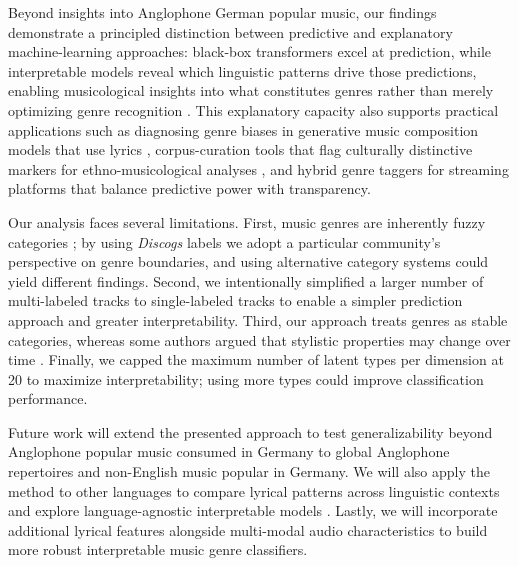 \documentclass{article}
\begin{document}
Beyond insights into Anglophone German popular music, our findings demonstrate a principled distinction between predictive and explanatory machine-learning approaches: black-box transformers excel at prediction, while interpretable models reveal which linguistic patterns drive those predictions, enabling musicological insights into what constitutes genres rather than merely optimizing genre recognition \cite{gardaziBERTApplicationsNatural2025}. This explanatory capacity also supports practical applications such as diagnosing genre biases in generative music composition models that use lyrics \cite{rudinStopExplainingBlack2019}, corpus-curation tools that flag culturally distinctive markers for ethno-musicological analyses \cite{stoiaBluesLyricFormulas2020}, and hybrid genre taggers for streaming platforms that balance predictive power with transparency.

Our analysis faces several limitations. First, music genres are inherently fuzzy categories \cite{vanvenrooijCategoricalAmbiguityCultural2018}; by using \textit{Discogs} labels we adopt a particular community’s perspective on genre boundaries, and using alternative category systems could yield different findings. Second, we intentionally simplified a larger number of multi-labeled tracks to single-labeled tracks to enable a simpler prediction approach and greater interpretability. Third, our approach treats genres as stable categories, whereas some authors argued that stylistic properties may change over time \cite{lenaClassificationCultureTypes2008}. Finally, we capped the maximum number of latent types per dimension at 20 to maximize interpretability; using more types could improve classification performance.

Future work will extend the presented approach to test generalizability beyond Anglophone popular music consumed in Germany to global Anglophone repertoires and non-English music popular in Germany. We will also apply the method to other languages to compare lyrical patterns across linguistic contexts and explore language-agnostic interpretable models \cite{wernerEnglishGermanPop2023}. Lastly, we will incorporate additional lyrical features alongside multi-modal audio characteristics to build more robust interpretable music genre classifiers.


\end{document}
